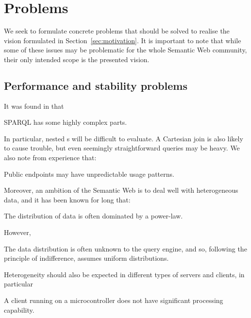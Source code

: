 \section{Problems}\label{sec:problems}

We seek to formulate concrete problems that should be solved to
realise the vision formulated in Section~\ref{sec:motivation}. It is
important to note that while some of these issues may be problematic
for the whole Semantic Web community, their only intended scope is the
presented vision.

\subsection{Performance and stability problems}\label{sec:perfproblems}

It was found in \cite{perez2009semantics} that

\begin{problem}\label{prob:sparqlcomplex}
SPARQL has some highly complex parts.
\end{problem}

In particular, nested s will be difficult to
evaluate. A Cartesian join is also likely to cause trouble, but even
seemingly straightforward queries may be heavy. We also note from
experience that:

\begin{problem}\label{prob:endpointunpred}
Public endpoints may have unpredictable usage patterns.
\end{problem}

Moreover, an ambition of the Semantic Web is to deal well with
heterogeneous data, and it has been known for long \cite{1385469} that:

\begin{problem}\label{prob:zipf}
The distribution of data is often dominated by a power-law.
\end{problem}
However, 
\begin{problem}\label{prob:uniform}
The data distribution is often unknown to the query engine, and so,
following the principle of indifference, assumes uniform
distributions.
\end{problem}

Heterogeneity should also be expected in different types of servers
and clients, in particular

\begin{problem}\label{prob:microcontroller}
A client running on a microcontroller does not have significant
processing capability.
\end{problem}



